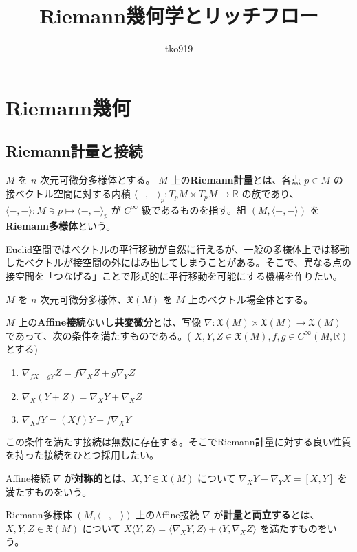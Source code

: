 \documentclass[dvipdfmx,a4paper]{jsreport}
\title{Riemann幾何学とリッチフロー}
\author{tko919}
\date{}
\theoremstyle{definition}
\newcommand{\R}{\mathbb{R}}
\begin{document}
\maketitle
\tableofcontents

\chapter{Riemann幾何}

\section{Riemann計量と接続}
 $M$ を $n$ 次元可微分多様体とする。 $M$ 上の\textbf{Riemann計量}とは、各点 $p \in M$ の接ベクトル空間に対する内積 $\langle -,- \rangle_p \colon T_pM \times T_pM \to \R$ の族であり、$\langle -,- \rangle \colon M \ni p \mapsto \langle -,- \rangle_p$ が $C^\infty$ 級であるものを指す。組 $(M,\langle -,- \rangle)$ を\textbf{Riemann多様体}という。


Euclid空間ではベクトルの平行移動が自然に行えるが、一般の多様体上では移動したベクトルが接空間の外にはみ出してしまうことがある。そこで、異なる点の接空間を「つなげる」ことで形式的に平行移動を可能にする機構を作りたい。

 $M$ を $n$ 次元可微分多様体、$\mathfrak{X}(M)$ を $M$ 上のベクトル場全体とする。

$M$ 上の\textbf{Affine接続}ないし\textbf{共変微分}とは、写像 $\nabla:\mathfrak{X}(M) \times \mathfrak{X}(M) \to \mathfrak{X}(M)$ であって、次の条件を満たすものである。( $X,Y,Z \in \mathfrak{X}(M), f,g \in C^\infty(M,\R)$ とする)

\begin{enumerate}
    \item $\nabla_{fX+gY}Z=f\nabla_XZ+g\nabla_Y Z$
    \item $\nabla_{X}(Y+Z)=\nabla_XY+\nabla_X Z$ 
    \item $\nabla_{X}fY=(Xf)Y+f\nabla_X Y$
\end{enumerate}

この条件を満たす接続は無数に存在する。そこでRiemann計量に対する良い性質を持った接続をひとつ採用したい。

 Affine接続 $\nabla$ が\textbf{対称的}とは、$X,Y \in \mathfrak{X}(M)$ について $\nabla_XY-\nabla_YX=[X,Y]$ を満たすものをいう。

 Riemann多様体 $(M,\langle -,- \rangle)$ 上のAffine接続 $\nabla$ が\textbf{計量と両立する}とは、$X,Y,Z \in \mathfrak{X}(M)$ について $X \langle Y,Z \rangle=\langle \nabla_X Y,Z \rangle+\langle Y,\nabla_X Z \rangle$ を満たすものをいう。
\end{document}
